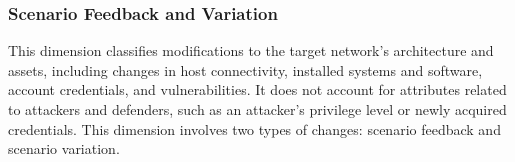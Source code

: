 


\subsubsection{Scenario Feedback and Variation}


This dimension classifies modifications to the target network's architecture and assets, including changes in host connectivity, installed systems and software, account credentials, and vulnerabilities. It does not account for attributes related to attackers and defenders, such as an attacker’s privilege level or newly acquired credentials.
This dimension involves two types of changes: scenario feedback and scenario variation. 

